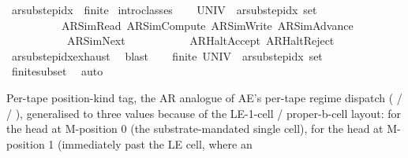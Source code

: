 \begin{isabellebody}
\isanewline
{}\isamarkupfalse%
\ ar{\isacharunderscore}{\kern0pt}substep{\isacharunderscore}{\kern0pt}idx\ {\isacharcolon}{\kern0pt}{\isacharcolon}{\kern0pt}\ finite\isanewline
%
\isadelimproof
%
\endisadelimproof
%
\isatagproof
{}\isamarkupfalse%
\ {\isacharparenleft}{\kern0pt}intro{\isacharunderscore}{\kern0pt}classes{\isacharparenright}{\kern0pt}\isanewline
\ \ \isamarkupfalse%
\ {\isachardoublequoteopen}{\isacharparenleft}{\kern0pt}UNIV\ {\isacharcolon}{\kern0pt}{\isacharcolon}{\kern0pt}\ ar{\isacharunderscore}{\kern0pt}substep{\isacharunderscore}{\kern0pt}idx\ set{\isacharparenright}{\kern0pt}\ {\isasymsubseteq}\isanewline
\ \ \ \ \ \ \ \ \ \ {\isacharbraceleft}{\kern0pt}AR{\isacharunderscore}{\kern0pt}SimRead{\isacharcomma}{\kern0pt}\ AR{\isacharunderscore}{\kern0pt}SimCompute{\isacharcomma}{\kern0pt}\ AR{\isacharunderscore}{\kern0pt}SimWrite{\isacharcomma}{\kern0pt}\ AR{\isacharunderscore}{\kern0pt}SimAdvance{\isacharcomma}{\kern0pt}\isanewline
\ \ \ \ \ \ \ \ \ \ \ AR{\isacharunderscore}{\kern0pt}SimNext{\isacharcomma}{\kern0pt}\isanewline
\ \ \ \ \ \ \ \ \ \ \ AR{\isacharunderscore}{\kern0pt}HaltAccept{\isacharcomma}{\kern0pt}\ AR{\isacharunderscore}{\kern0pt}HaltReject{\isacharbraceright}{\kern0pt}{\isachardoublequoteclose}\isanewline
\ \ \ \ \isamarkupfalse%
\ ar{\isacharunderscore}{\kern0pt}substep{\isacharunderscore}{\kern0pt}idx{\isachardot}{\kern0pt}exhaust\ \isamarkupfalse%
\ blast\isanewline
\ \ \isamarkupfalse%
\ {\isachardoublequoteopen}finite\ {\isacharparenleft}{\kern0pt}UNIV\ {\isacharcolon}{\kern0pt}{\isacharcolon}{\kern0pt}\ ar{\isacharunderscore}{\kern0pt}substep{\isacharunderscore}{\kern0pt}idx\ set{\isacharparenright}{\kern0pt}{\isachardoublequoteclose}\isanewline
\ \ \ \ \isamarkupfalse%
\ finite{\isacharunderscore}{\kern0pt}subset\ \isamarkupfalse%
\ auto\isanewline
{}\isamarkupfalse%
%
\endisatagproof
{\isafoldproof}%
%
\isadelimproof
%
\endisadelimproof
%
\begin{isamarkuptext}%
Per-tape position-kind tag, the AR analogue of AE's
  per-tape regime dispatch ( /  /
  ), generalised to three values because of the
  LE-1-cell / proper-b-cell layout:  for the
  head at M-position 0 (the substrate-mandated single
   cell),  for the head at
  M-position 1 (immediately past the LE cell, where an

\end{isamarkuptext}
\end{isabellebody}

